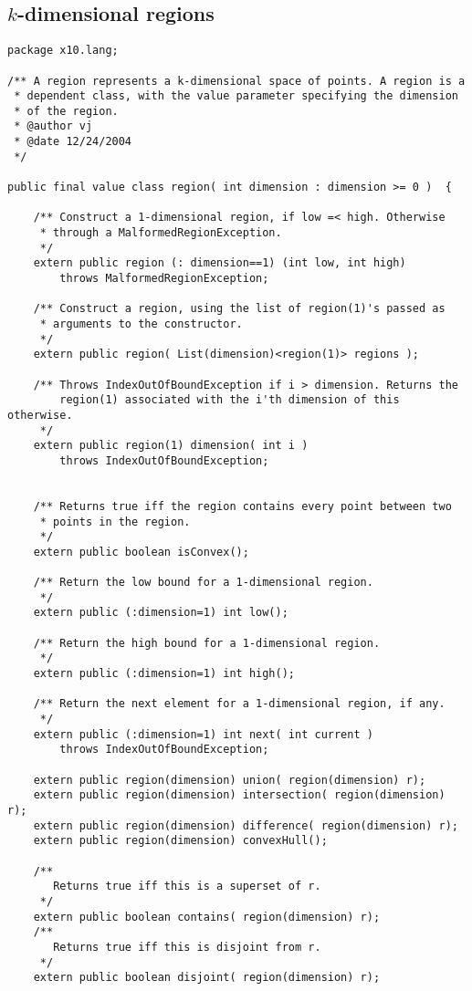 \documentclass[fullpage]{article}
\begin{document}
\subsection{$k$-dimensional regions}
{\footnotesize
\begin{verbatim}
package x10.lang;

/** A region represents a k-dimensional space of points. A region is a
 * dependent class, with the value parameter specifying the dimension
 * of the region.
 * @author vj 
 * @date 12/24/2004
 */

public final value class region( int dimension : dimension >= 0 )  {

    /** Construct a 1-dimensional region, if low =< high. Otherwise
     * through a MalformedRegionException.
     */
    extern public region (: dimension==1) (int low, int high) 
        throws MalformedRegionException;

    /** Construct a region, using the list of region(1)'s passed as
     * arguments to the constructor.
     */
    extern public region( List(dimension)<region(1)> regions );

    /** Throws IndexOutOfBoundException if i > dimension. Returns the
        region(1) associated with the i'th dimension of this otherwise.
     */
    extern public region(1) dimension( int i ) 
        throws IndexOutOfBoundException;


    /** Returns true iff the region contains every point between two
     * points in the region.
     */
    extern public boolean isConvex();

    /** Return the low bound for a 1-dimensional region.
     */
    extern public (:dimension=1) int low();

    /** Return the high bound for a 1-dimensional region.
     */
    extern public (:dimension=1) int high();

    /** Return the next element for a 1-dimensional region, if any.
     */
    extern public (:dimension=1) int next( int current ) 
        throws IndexOutOfBoundException; 

    extern public region(dimension) union( region(dimension) r);
    extern public region(dimension) intersection( region(dimension) r);
    extern public region(dimension) difference( region(dimension) r);
    extern public region(dimension) convexHull();

    /**
       Returns true iff this is a superset of r.
     */
    extern public boolean contains( region(dimension) r);
    /**
       Returns true iff this is disjoint from r.
     */
    extern public boolean disjoint( region(dimension) r);


\end{verbatim}}
\end{document}
